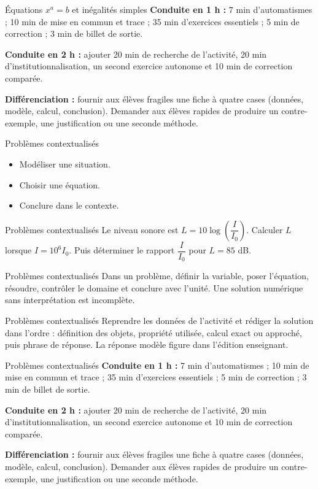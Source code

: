 \documentclass[aspectratio=169,10pt]{beamer}
\begin{document}
\begin{frame}{Équations \(x^a=b\) et inégalités simples}
\textbf{Conduite en 1 h :} 7 min d'automatismes ; 10 min de mise en commun et trace ; 35 min d'exercices essentiels ; 5 min de correction ; 3 min de billet de sortie.

\textbf{Conduite en 2 h :} ajouter 20 min de recherche de l'activité, 20 min d'institutionnalisation, un second exercice autonome et 10 min de correction comparée.

\textbf{Différenciation :} fournir aux élèves fragiles une fiche à quatre cases (données, modèle, calcul, conclusion). Demander aux élèves rapides de produire un contre-exemple, une justification ou une seconde méthode.
\end{frame}
\begin{frame}{Problèmes contextualisés}
\begin{itemize}
\item Modéliser une situation.
\item Choisir une équation.
\item Conclure dans le contexte.

\end{itemize}
\end{frame}
\begin{frame}{Problèmes contextualisés}
Le niveau sonore est \(L=10\log\!\left(\dfrac I{I_0}\right)\). Calculer \(L\) lorsque \(I=10^6I_0\). Puis déterminer le rapport \(\dfrac I{I_0}\) pour \(L=85\) dB.
\end{frame}
\begin{frame}{Problèmes contextualisés}
Dans un problème, définir la variable, poser l'équation, résoudre, contrôler le domaine et conclure avec l'unité. Une solution numérique sans interprétation est incomplète.
\end{frame}
\begin{frame}{Problèmes contextualisés}
Reprendre les données de l'activité et rédiger la solution dans l'ordre : définition des objets, propriété utilisée, calcul exact ou approché, puis phrase de réponse. La réponse modèle figure dans l'édition enseignant.
\end{frame}
\begin{frame}{Problèmes contextualisés}
\textbf{Conduite en 1 h :} 7 min d'automatismes ; 10 min de mise en commun et trace ; 35 min d'exercices essentiels ; 5 min de correction ; 3 min de billet de sortie.

\textbf{Conduite en 2 h :} ajouter 20 min de recherche de l'activité, 20 min d'institutionnalisation, un second exercice autonome et 10 min de correction comparée.

\textbf{Différenciation :} fournir aux élèves fragiles une fiche à quatre cases (données, modèle, calcul, conclusion). Demander aux élèves rapides de produire un contre-exemple, une justification ou une seconde méthode.
\end{frame}
\end{document}
